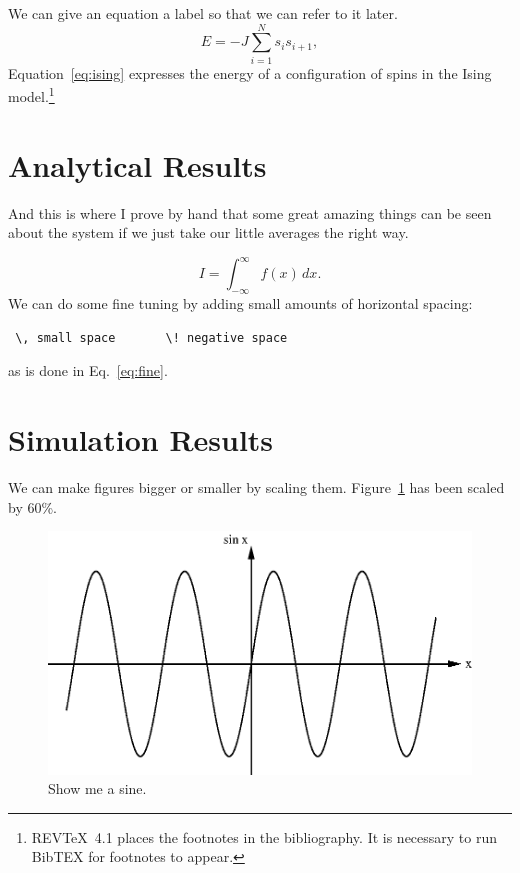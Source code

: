 \documentclass[prb,11pt]{revtex4-1}
\begin{document}
We can give an equation a label so that we can refer to it later.
\begin{equation}
\label{eq:ising}
E = -J \sum_{i=1}^N s_i s_{i+1},
\end{equation}
Equation~\eqref{eq:ising} expresses the energy of a configuration
of spins in the Ising model.\footnote{REVTeX~4.1 places the footnotes in the bibliography. It is necessary to run BibTEX for footnotes to appear.}


\section{Analytical Results}
And this is where I prove by hand that some great amazing things can be seen about the system if we just take our little averages the right way.

\begin{equation}
I = \! \int_{-\infty}^\infty f(x)\,dx \label{eq:fine}.
\end{equation}
We can do some fine tuning by adding small amounts of horizontal
spacing:
\begin{verbatim}
 \, small space       \! negative space
\end{verbatim}
as is done in Eq.~\eqref{eq:fine}.



\section{Simulation Results}

We can make figures bigger or smaller by scaling them. Figure~\ref{fig:sine}
has been scaled by 60\%.

\begin{figure}[h!]
\centering
\includegraphics[scale=0.6]{sine}
\caption{\label{fig:sine}Show me a sine.}
\end{figure}
\end{document}
